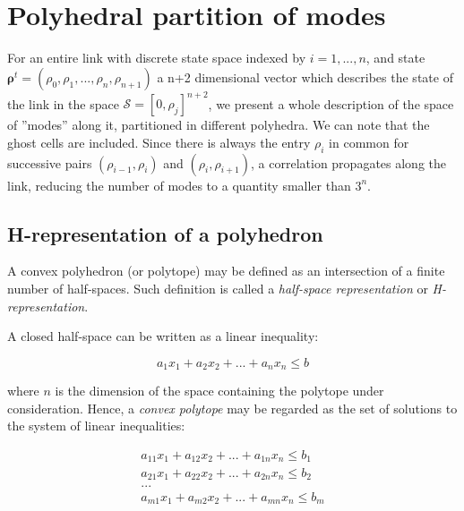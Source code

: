 \appendix

\section{Polyhedral partition of modes}

For an entire link with discrete state space indexed by $i = 1,...,n$, and state $\boldsymbol\rho^{t} = (\rho_{0},\rho_{1},...,\rho_{n},\rho_{n+1})$ a n+2 dimensional vector which describes the state of the link in the space $\mathcal{S} = [0,\rho_{j}]^{n+2}$, we present a whole description of the space of ''modes'' along it, partitioned in different polyhedra. We can note that the ghost cells are included. Since there is always the entry $\rho_{i}$ in common for successive pairs $(\rho_{i-1},\rho_{i})$ and $(\rho_{i},\rho_{i+1})$, a correlation propagates along the link, reducing the number of modes to a quantity smaller than $3^{n}$.


\subsection{H-representation of a polyhedron}\label{sec:polytope}

A convex polyhedron (or polytope) may be defined as an intersection of a finite number of half-spaces. Such definition is called a \textit{half-space representation} or \textit{H-representation}.

\noindent A closed half-space can be written as a linear inequality:

\begin{equation}
a_{1}x_{1} + a_{2}x_{2} + ... + a_{n}x_{n} \leq b
\label{eq:closedHalfSpace}
\end{equation}

\noindent where $n$ is the dimension of the space containing the polytope under consideration. Hence, a \textit{convex polytope} may be regarded as the set of solutions to the system of linear inequalities:

\begin{equation}
\begin{array}{l}
a_{11}x_{1} + a_{12}x_{2} + ... + a_{1n}x_{n} \leq b_{1}\\
a_{21}x_{1} + a_{22}x_{2} + ... + a_{2n}x_{n} \leq b_{2}\\
...\\
a_{m1}x_{1} + a_{m2}x_{2} + ... + a_{mn}x_{n} \leq b_{m}
\end{array}
\label{eq:hRepresentation}
\end{equation}


